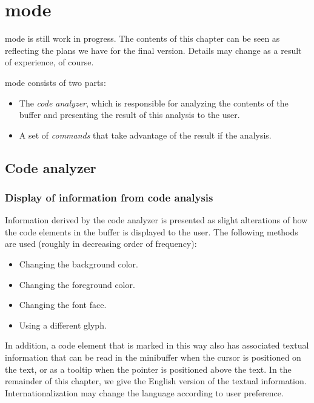 \chapter{\commonlisp{} mode}

\commonlisp{} mode is still work in progress.  The contents of this
chapter can be seen as reflecting the plans we have for the final
version.  Details may change as a result of experience, of course.

\commonlisp{} mode consists of two parts:

\begin{itemize}
\item The \emph{code analyzer}, which is responsible for analyzing
  the contents of the buffer and presenting the result of this
  analysis to the user.
\item A set of \emph{commands} that take advantage of the result if
  the analysis. 
\end{itemize}

\section{Code analyzer}

\subsection{Display of information from code analysis}

Information derived by the code analyzer is presented as slight
alterations of how the code elements in the buffer is displayed to the
user.  The following methods are used (roughly in decreasing order of
frequency):

\begin{itemize}
\item Changing the background color.
\item Changing the foreground color.
\item Changing the font face.
\item Using a different glyph.
\end{itemize}

In addition, a code element that is marked in this way also has
associated textual information that can be read in the minibuffer when
the cursor is positioned on the text, or as a tooltip when the pointer
is positioned above the text.  In the remainder of this chapter, we
give the English version of the textual information.
Internationalization may change the language according to user
preference.

